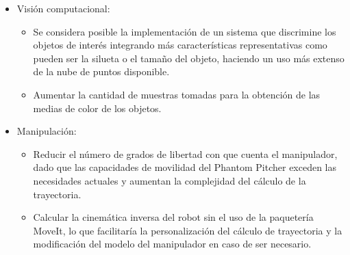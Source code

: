 \begin{itemize}
\item Visión computacional:
    \begin{itemize}
        \item Se considera posible la implementación de un sistema que discrimine los objetos de interés integrando más características representativas como pueden ser la silueta o el tamaño del objeto, haciendo un uso más extenso de la nube de puntos disponible.
        \item Aumentar la cantidad de muestras tomadas para la obtención de las medias de color de los objetos.
    \end{itemize}   
\item Manipulación: 
    \begin{itemize}
        \item Reducir el número de grados de libertad con que cuenta el manipulador, dado que las capacidades de movilidad del Phantom Pitcher exceden las necesidades actuales y aumentan la complejidad del cálculo de la trayectoria.
        \item Calcular la cinemática inversa del robot sin el uso de la paquetería MoveIt, lo que facilitaría la personalización del cálculo de trayectoria y la modificación del modelo del manipulador en caso de ser necesario.
    \end{itemize} 
\end{itemize}